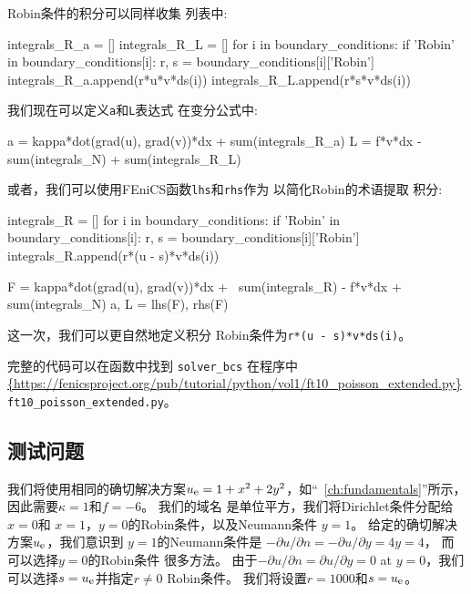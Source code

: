 Robin条件的积分可以同样收集
列表中:

\begin{python}
integrals_R_a = []
integrals_R_L = []
for i in boundary_conditions:
    if 'Robin' in boundary_conditions[i]:
        r, s = boundary_conditions[i]['Robin']
        integrals_R_a.append(r*u*v*ds(i))
        integrals_R_L.append(r*s*v*ds(i))
\end{python}

我们现在可以定义\texttt{a}和\texttt{L}表达式
在变分公式中:

\begin{python}
a = kappa*dot(grad(u), grad(v))*dx + sum(integrals_R_a)
L = f*v*dx - sum(integrals_N) + sum(integrals_R_L)
\end{python}


或者，我们可以使用FEniCS函数\texttt{lhs}和\texttt{rhs}作为
以简化Robin的术语提取
积分:

\begin{python}
integrals_R = []
for i in boundary_conditions:
    if 'Robin' in boundary_conditions[i]:
        r, s = boundary_conditions[i]['Robin']
        integrals_R.append(r*(u - s)*v*ds(i))

F = kappa*dot(grad(u), grad(v))*dx + \
    sum(integrals_R) - f*v*dx + sum(integrals_N)
a, L = lhs(F), rhs(F)
\end{python}
这一次，我们可以更自然地定义积分
Robin条件为\texttt{r*(u - s)*v*ds(i)}。

完整的代码可以在函数中找到
\verb!solver_bcs! 在程序中
\url{{https://fenicsproject.org/pub/tutorial/python/vol1/ft10_poisson_extended.py}}{\nolinkurl{ft10_poisson_extended.py}}。


\subsection{测试问题}

我们将使用相同的确切解决方案$\uex = 1 + x^2 + 2y^2$，如“~\ref{ch:fundamentals}”所示，因此需要$\kappa = 1$和$f = -6$。 我们的域名
是单位平方，我们将Dirichlet条件分配给$x = 0$和
$x = 1$，$y = 0$的Robin条件，以及Neumann条件
$y =1$。 给定的确切解决方案$\uex$，我们意识到
$y = 1$的Neumann条件是
$-\partial u / \partial n = -\partial u /\partial y = 4y = 4$，
而可以选择$y = 0$的Robin条件
很多方法。 由于$-\partial u/\partial n=\partial u/\partial y = 0$ at
$y = 0$，我们可以选择$s = \uex$并指定$r \neq 0$
Robin条件。 我们将设置$r = 1000$和$s = \uex$。

